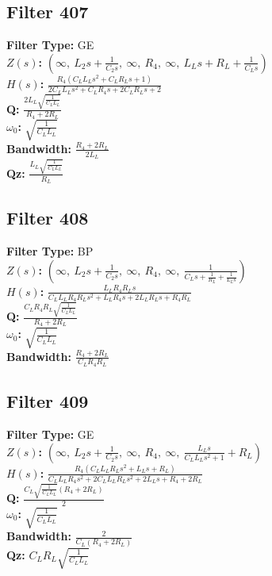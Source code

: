 \documentclass{article}
\begin{document}
\subsection*{Filter 407}
\textbf{Filter Type:} GE \\ 
\textbf{$Z(s)$:} $\left( \infty, \  L_{2} s + \frac{1}{C_{2} s}, \  \infty, \  R_{4}, \  \infty, \  L_{L} s + R_{L} + \frac{1}{C_{L} s}\right)$ \\ 
\textbf{$H(s)$:} $\frac{R_{4} \left(C_{L} L_{L} s^{2} + C_{L} R_{L} s + 1\right)}{2 C_{L} L_{L} s^{2} + C_{L} R_{4} s + 2 C_{L} R_{L} s + 2}$ \\ 
\textbf{Q:} $\frac{2 L_{L} \sqrt{\frac{1}{C_{L} L_{L}}}}{R_{4} + 2 R_{L}}$ \\ 
\textbf{$\omega_0$:} $\sqrt{\frac{1}{C_{L} L_{L}}}$ \\ 
\textbf{Bandwidth:} $\frac{R_{4} + 2 R_{L}}{2 L_{L}}$ \\ 
\textbf{Qz:} $\frac{L_{L} \sqrt{\frac{1}{C_{L} L_{L}}}}{R_{L}}$ \\ 
\subsection*{Filter 408}
\textbf{Filter Type:} BP \\ 
\textbf{$Z(s)$:} $\left( \infty, \  L_{2} s + \frac{1}{C_{2} s}, \  \infty, \  R_{4}, \  \infty, \  \frac{1}{C_{L} s + \frac{1}{R_{L}} + \frac{1}{L_{L} s}}\right)$ \\ 
\textbf{$H(s)$:} $\frac{L_{L} R_{4} R_{L} s}{C_{L} L_{L} R_{4} R_{L} s^{2} + L_{L} R_{4} s + 2 L_{L} R_{L} s + R_{4} R_{L}}$ \\ 
\textbf{Q:} $\frac{C_{L} R_{4} R_{L} \sqrt{\frac{1}{C_{L} L_{L}}}}{R_{4} + 2 R_{L}}$ \\ 
\textbf{$\omega_0$:} $\sqrt{\frac{1}{C_{L} L_{L}}}$ \\ 
\textbf{Bandwidth:} $\frac{R_{4} + 2 R_{L}}{C_{L} R_{4} R_{L}}$ \\ 
\subsection*{Filter 409}
\textbf{Filter Type:} GE \\ 
\textbf{$Z(s)$:} $\left( \infty, \  L_{2} s + \frac{1}{C_{2} s}, \  \infty, \  R_{4}, \  \infty, \  \frac{L_{L} s}{C_{L} L_{L} s^{2} + 1} + R_{L}\right)$ \\ 
\textbf{$H(s)$:} $\frac{R_{4} \left(C_{L} L_{L} R_{L} s^{2} + L_{L} s + R_{L}\right)}{C_{L} L_{L} R_{4} s^{2} + 2 C_{L} L_{L} R_{L} s^{2} + 2 L_{L} s + R_{4} + 2 R_{L}}$ \\ 
\textbf{Q:} $\frac{C_{L} \sqrt{\frac{1}{C_{L} L_{L}}} \left(R_{4} + 2 R_{L}\right)}{2}$ \\ 
\textbf{$\omega_0$:} $\sqrt{\frac{1}{C_{L} L_{L}}}$ \\ 
\textbf{Bandwidth:} $\frac{2}{C_{L} \left(R_{4} + 2 R_{L}\right)}$ \\ 
\textbf{Qz:} $C_{L} R_{L} \sqrt{\frac{1}{C_{L} L_{L}}}$ \\ 
\end{document}
